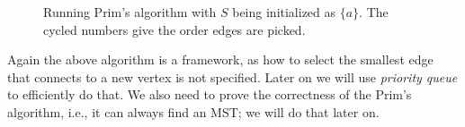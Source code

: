 \begin{figure}[h]
\centering{}
\caption{Running Prim's algorithm with $S$ being initialized as $\{a\}$. The cycled numbers give the order edges are picked.}
\label{fig:mst2}
\end{figure}


Again the above algorithm is a framework, as how to select the
smallest edge that connects to a new vertex is not specified. 
Later on we will use \emph{priority queue} to efficiently do that.
We also need to prove the correctness of the Prim's algorithm, i.e., it can always find
an MST; we will do that later on.


